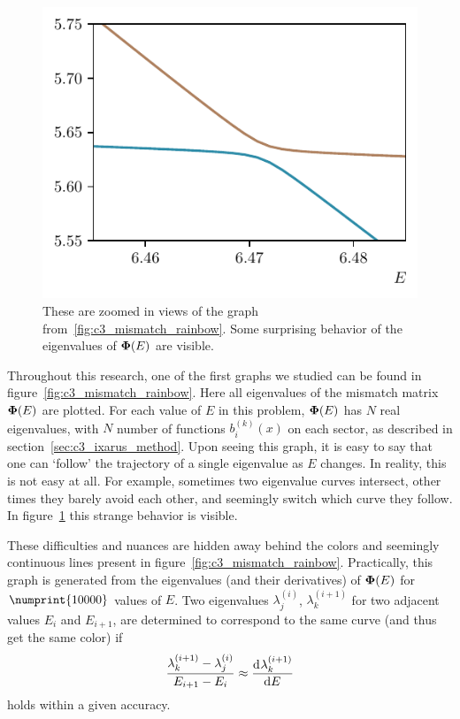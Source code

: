 \begin{figure}
\begin{center}
    \hfill
    \includegraphics[width=.495\textwidth]{img/chapter3/mismatch_rainbow_zoomed_1.pdf}
  \end{center}
  \caption{These are zoomed in views of the graph from~\ref{fig:c3_mismatch_rainbow}. Some surprising behavior of the eigenvalues of $\vb{\Phi}(E)$ are visible.}\label{fig:c3_mismatch_rainbow_zoom}
\end{figure}

Throughout this research, one of the first graphs we studied can be found in figure~\ref{fig:c3_mismatch_rainbow}. Here all eigenvalues of the mismatch matrix $\vb{\Phi}(E)$ are plotted. For each value of $E$ in this problem, $\vb{\Phi}(E)$ has $N$ real eigenvalues, with $N$ number of functions $b_i^{(k)}(x)$ on each sector, as described in section~\ref{sec:c3_ixarus_method}. Upon seeing this graph, it is easy to say that one can `follow' the trajectory of a single eigenvalue as $E$ changes. In reality, this is not easy at all. For example, sometimes two eigenvalue curves intersect, other times they barely avoid each other, and seemingly switch which curve they follow. In figure~\ref{fig:c3_mismatch_rainbow_zoom} this strange behavior is visible.


These difficulties and nuances are hidden away behind the colors and seemingly continuous lines present in figure~\ref{fig:c3_mismatch_rainbow}. Practically, this graph is generated from the eigenvalues (and their derivatives) of $\vb{\Phi}(E)$ for $\numprint{10000}$ values of $E$. Two eigenvalues $\lambda^{(i)}_j$, $\lambda^{(i+1)}_k$  for two adjacent values $E_{i}$ and $E_{i+1}$, are determined to correspond to the same curve (and thus get the same color) if
$$ \frac{\lambda^{(i+1)}_k  - \lambda^{(i)}_j}{E_{i+1} - E_i} \approx \dv[]{\lambda^{(i+1)}_k}{E} $$
holds within a given accuracy.


